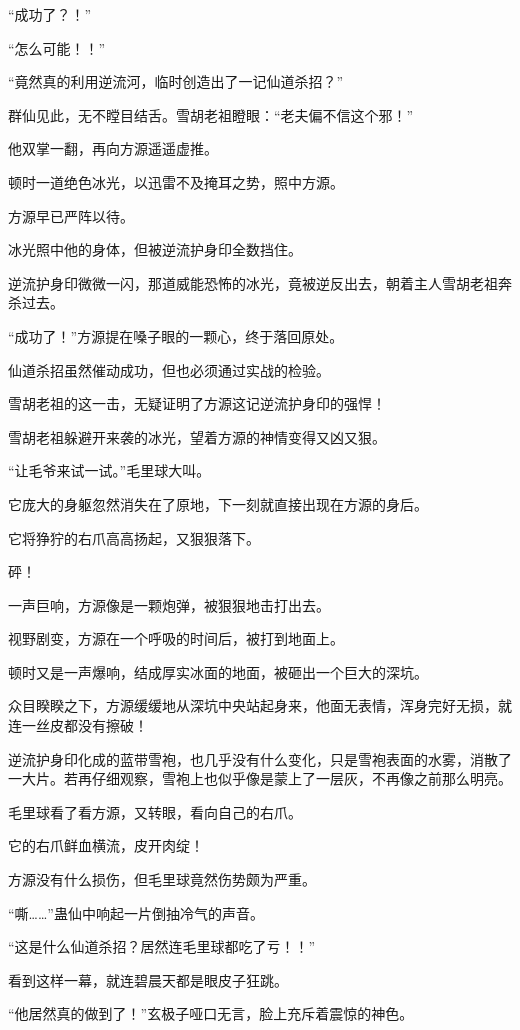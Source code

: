 \begin{this_body}
“成功了？！”

“怎么可能！！”

“竟然真的利用逆流河，临时创造出了一记仙道杀招？”

群仙见此，无不瞠目结舌。雪胡老祖瞪眼：“老夫偏不信这个邪！”

他双掌一翻，再向方源遥遥虚推。

顿时一道绝色冰光，以迅雷不及掩耳之势，照中方源。

方源早已严阵以待。

冰光照中他的身体，但被逆流护身印全数挡住。

逆流护身印微微一闪，那道威能恐怖的冰光，竟被逆反出去，朝着主人雪胡老祖奔杀过去。

“成功了！”方源提在嗓子眼的一颗心，终于落回原处。

仙道杀招虽然催动成功，但也必须通过实战的检验。

雪胡老祖的这一击，无疑证明了方源这记逆流护身印的强悍！

雪胡老祖躲避开来袭的冰光，望着方源的神情变得又凶又狠。

“让毛爷来试一试。”毛里球大叫。

它庞大的身躯忽然消失在了原地，下一刻就直接出现在方源的身后。

它将狰狞的右爪高高扬起，又狠狠落下。

砰！

一声巨响，方源像是一颗炮弹，被狠狠地击打出去。

视野剧变，方源在一个呼吸的时间后，被打到地面上。

顿时又是一声爆响，结成厚实冰面的地面，被砸出一个巨大的深坑。

众目睽睽之下，方源缓缓地从深坑中央站起身来，他面无表情，浑身完好无损，就连一丝皮都没有擦破！

逆流护身印化成的蓝带雪袍，也几乎没有什么变化，只是雪袍表面的水雾，消散了一大片。若再仔细观察，雪袍上也似乎像是蒙上了一层灰，不再像之前那么明亮。

毛里球看了看方源，又转眼，看向自己的右爪。

它的右爪鲜血横流，皮开肉绽！

方源没有什么损伤，但毛里球竟然伤势颇为严重。

“嘶……”蛊仙中响起一片倒抽冷气的声音。

“这是什么仙道杀招？居然连毛里球都吃了亏！！”

看到这样一幕，就连碧晨天都是眼皮子狂跳。

“他居然真的做到了！”玄极子哑口无言，脸上充斥着震惊的神色。


\end{this_body}
